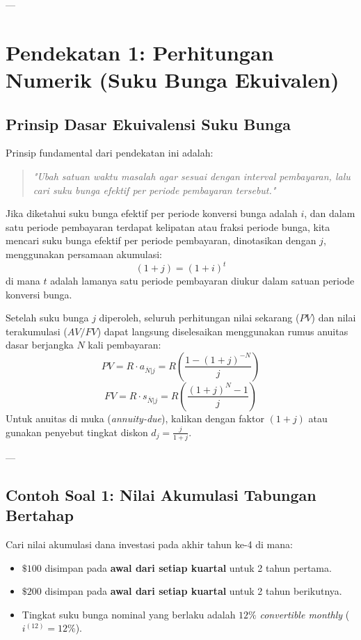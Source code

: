 \documentclass[11pt,a4paper]{article}
\begin{document}
---

\section{Pendekatan 1: Perhitungan Numerik (Suku Bunga Ekuivalen)}

\subsection{Prinsip Dasar Ekuivalensi Suku Bunga}
Prinsip fundamental dari pendekatan ini adalah:
\begin{quote}
    \textit{"Ubah satuan waktu masalah agar sesuai dengan interval pembayaran, lalu cari suku bunga efektif per periode pembayaran tersebut."}
\end{quote}

Jika diketahui suku bunga efektif per periode konversi bunga adalah $i$, dan dalam satu periode pembayaran terdapat kelipatan atau fraksi periode bunga, kita mencari suku bunga efektif per periode pembayaran, dinotasikan dengan $j$, menggunakan persamaan akumulasi:
\begin{equation}
    (1 + j) = (1 + i)^t
\end{equation}
di mana $t$ adalah lamanya satu periode pembayaran diukur dalam satuan periode konversi bunga.

Setelah suku bunga $j$ diperoleh, seluruh perhitungan nilai sekarang ($PV$) dan nilai terakumulasi ($AV/FV$) dapat langsung diselesaikan menggunakan rumus anuitas dasar berjangka $N$ kali pembayaran:
\begin{equation}
    PV = R \cdot a_{\overline{N}|j} = R \left( \frac{1 - (1+j)^{-N}}{j} \right)
\end{equation}
\begin{equation}
    FV = R \cdot s_{\overline{N}|j} = R \left( \frac{(1+j)^N - 1}{j} \right)
\end{equation}
Untuk anuitas di muka (\textit{annuity-due}), kalikan dengan faktor $(1+j)$ atau gunakan penyebut tingkat diskon $d_j = \frac{j}{1+j}$.

---

\subsection{Contoh Soal 1: Nilai Akumulasi Tabungan Bertahap}

\begin{examplebox}
Cari nilai akumulasi dana investasi pada akhir tahun ke-4 di mana:
\begin{itemize}
    \item $\$100$ disimpan pada \textbf{awal dari setiap kuartal} untuk 2 tahun pertama.
    \item $\$200$ disimpan pada \textbf{awal dari setiap kuartal} untuk 2 tahun berikutnya.
    \item Tingkat suku bunga nominal yang berlaku adalah $12\%$ \textit{convertible monthly} ($i^{(12)} = 12\%$).
\end{itemize}
\end{examplebox}
\end{document}
